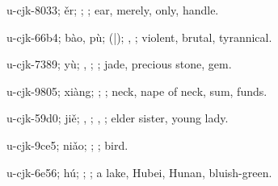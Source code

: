 \begin{multicols}{2}
{\cjkgGlue{}u-cjk-8033; ěr; \cjkgGlue{}; \cjkgGlue{}; ear, merely, only, handle.

\cjkgGlue{}u-cjk-66b4; bào, pù; \cjkgGlue{}\cjkgGlue{}(\cjkgGlue{}|\cjkgGlue{}); \cjkgGlue{}, \cjkgGlue{}; violent, brutal, tyrannical.

\cjkgGlue{}u-cjk-7389; yù; \cjkgGlue{}, \cjkgGlue{}; \cjkgGlue{}; jade, precious stone, gem.

\cjkgGlue{}u-cjk-9805; xiàng; \cjkgGlue{}; \cjkgGlue{}; neck, nape of neck, sum, funds.

\cjkgGlue{}u-cjk-59d0; jiě; \cjkgGlue{}, \cjkgGlue{}; \cjkgGlue{}, \cjkgGlue{}; elder sister, young lady.

\cjkgGlue{}u-cjk-9ce5; niǎo; \cjkgGlue{}; \cjkgGlue{}; bird.

\cjkgGlue{}u-cjk-6e56; hú; \cjkgGlue{}; \cjkgGlue{}; a lake, Hubei, Hunan, bluish-green.

}
\end{multicols}
